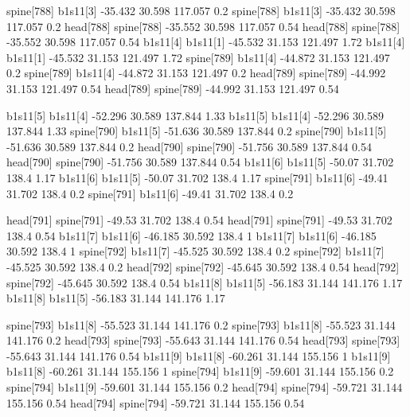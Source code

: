 spine[788]    b1s11[3]    -35.432    30.598    117.057    0.2
spine[788]    b1s11[3]    -35.432    30.598    117.057    0.2
head[788]    spine[788]    -35.552    30.598    117.057    0.54
head[788]    spine[788]    -35.552    30.598    117.057    0.54
b1s11[4]    b1s11[1]    -45.532    31.153    121.497    1.72
b1s11[4]    b1s11[1]    -45.532    31.153    121.497    1.72
spine[789]    b1s11[4]    -44.872    31.153    121.497    0.2
spine[789]    b1s11[4]    -44.872    31.153    121.497    0.2
head[789]    spine[789]    -44.992    31.153    121.497    0.54
head[789]    spine[789]    -44.992    31.153    121.497    0.54


b1s11[5]    b1s11[4]    -52.296    30.589    137.844    1.33
b1s11[5]    b1s11[4]    -52.296    30.589    137.844    1.33
spine[790]    b1s11[5]    -51.636    30.589    137.844    0.2
spine[790]    b1s11[5]    -51.636    30.589    137.844    0.2
head[790]    spine[790]    -51.756    30.589    137.844    0.54
head[790]    spine[790]    -51.756    30.589    137.844    0.54
b1s11[6]    b1s11[5]    -50.07    31.702    138.4    1.17
b1s11[6]    b1s11[5]    -50.07    31.702    138.4    1.17
spine[791]    b1s11[6]    -49.41    31.702    138.4    0.2
spine[791]    b1s11[6]    -49.41    31.702    138.4    0.2


head[791]    spine[791]    -49.53    31.702    138.4    0.54
head[791]    spine[791]    -49.53    31.702    138.4    0.54
b1s11[7]    b1s11[6]    -46.185    30.592    138.4    1
b1s11[7]    b1s11[6]    -46.185    30.592    138.4    1
spine[792]    b1s11[7]    -45.525    30.592    138.4    0.2
spine[792]    b1s11[7]    -45.525    30.592    138.4    0.2
head[792]    spine[792]    -45.645    30.592    138.4    0.54
head[792]    spine[792]    -45.645    30.592    138.4    0.54
b1s11[8]    b1s11[5]    -56.183    31.144    141.176    1.17
b1s11[8]    b1s11[5]    -56.183    31.144    141.176    1.17


spine[793]    b1s11[8]    -55.523    31.144    141.176    0.2
spine[793]    b1s11[8]    -55.523    31.144    141.176    0.2
head[793]    spine[793]    -55.643    31.144    141.176    0.54
head[793]    spine[793]    -55.643    31.144    141.176    0.54
b1s11[9]    b1s11[8]    -60.261    31.144    155.156    1
b1s11[9]    b1s11[8]    -60.261    31.144    155.156    1
spine[794]    b1s11[9]    -59.601    31.144    155.156    0.2
spine[794]    b1s11[9]    -59.601    31.144    155.156    0.2
head[794]    spine[794]    -59.721    31.144    155.156    0.54
head[794]    spine[794]    -59.721    31.144    155.156    0.54


